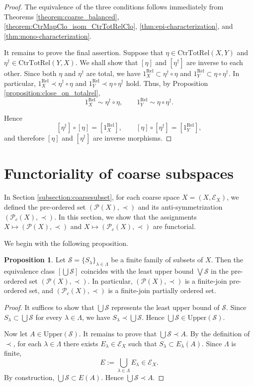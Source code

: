 \documentclass[12pt, a4paper]{amsart}
\theoremstyle{definition}
\newtheorem{proposition}[theorem]{Proposition}
\newcommand{\Rel}{\mathrm{Rel}}
\newcommand{\CtrTotRel}{\mathrm{CtrTotRel}}
\newcommand{\Upper}{\mathrm{Upper}}
\begin{document}
\begin{proof}
The equivalence of the three conditions follows immediately from
Theorems \ref{theorem:coarse_balanced},
\ref{theorem:CtrMapClo_isom_CtrTotRelClo},
\ref{thm:epi-characterization},
and \ref{thm:mono-characterization}.

It remains to prove the final assertion.
Suppose that
$\eta \in \CtrTotRel(X,Y)$
and
$\eta^\dagger \in \CtrTotRel(Y,X)$.
We shall show that
$[\eta]$
and
$[\eta^\dagger]$
are inverse to each other.
Since both $\eta$ and $\eta^\dagger$ are total, 
we have $1_X^{\Rel} \subset \eta^\dagger\circ \eta$ and $1_Y^{\Rel} \subset \eta\circ \eta^\dagger$.
In particular, $1_X^{\Rel} \prec \eta^\dagger\circ \eta$ and $1_Y^{\Rel} \prec \eta\circ \eta^\dagger$ hold.
Thus, by Proposition
\ref{proposition:close_on_totalrel},
\[
1_X^{\Rel}\sim\eta^\dagger \circ \eta,
\qquad
1_Y^{\Rel}\sim \eta \circ \eta^\dagger.
\]

Hence
\[
[\eta^\dagger]\circ[\eta]
=
[1_X^{\Rel}],
\qquad
[\eta]\circ[\eta^\dagger]
=
[1_Y^{\Rel}],
\]
and therefore
$[\eta]$
and
$[\eta^\dagger]$
are inverse morphisms.
\end{proof}

\section{Functoriality of coarse subspaces}\label{section:Fct_coarsesubset}

In Section \ref{subsection:coarsesubset}, for each coarse space
$X=(X,\mathcal E_X)$,
we defined the pre-ordered set
$(\mathcal{P}(X),\prec)$
and its anti-symmetrization
$(\mathcal{P}_c(X),\prec)$.
In this section, we show that the assignments
$X\mapsto(\mathcal{P}(X),\prec)$
and
$X\mapsto(\mathcal{P}_c(X),\prec)$
are functorial.

We begin with the following proposition.

\begin{proposition}\label{proposition:PcXfiniteJoin}
Let
$\mathcal{S}=\{S_\lambda\}_{\lambda\in\Lambda}$
be a finite family of subsets of $X$.
Then the equivalence class
$[\bigcup\mathcal{S}]$
coincides with the least upper bound
$\bigvee\mathcal{S}$ 
in the pre-ordered set $(\mathcal{P}(X),\prec)$.
In particular,
$(\mathcal{P}(X),\prec)$
is a finite-join pre-ordered set, and
$(\mathcal{P}_c(X),\prec)$
is a finite-join partially ordered set.
\end{proposition}

\begin{proof}
It suffices to show that
$\bigcup\mathcal{S}$
represents the least upper bound of
$\mathcal{S}$.
Since
$S_\lambda\subset\bigcup\mathcal{S}$
for every
$\lambda\in\Lambda$,
we have
$S_\lambda\prec\bigcup\mathcal{S}$.
Hence
$\bigcup\mathcal{S}\in\Upper(\mathcal{S})$.

Now let
$A\in\Upper(\mathcal{S})$.
It remains to prove that
$\bigcup\mathcal{S}\prec A$.
By the definition of
$\prec$,
for each
$\lambda\in\Lambda$
there exists
$E_\lambda\in\mathcal E_X$
such that
$S_\lambda\subset E_\lambda(A)$.
Since
$\Lambda$
is finite,
\[
E:=\bigcup_{\lambda\in\Lambda}E_\lambda
\in\mathcal E_X.
\]
By construction,
$\bigcup\mathcal{S}\subset E(A)$.
Hence
$\bigcup\mathcal{S}\prec A$.
\end{proof}
\end{document}

